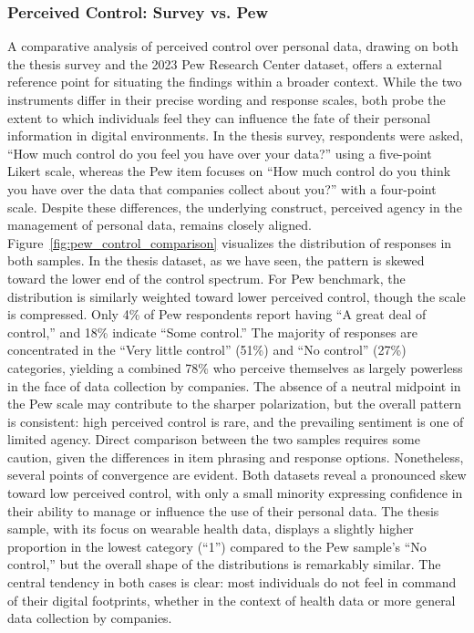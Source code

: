 	\subsubsection{Perceived Control: Survey vs. Pew}
		A comparative analysis of perceived control over personal data, drawing on both the thesis survey and the 2023 Pew Research Center dataset, offers a external reference point for situating the findings within a broader context. While the two instruments differ in their precise wording and response scales, both probe the extent to which individuals feel they can influence the fate of their personal information in digital environments. In the thesis survey, respondents were asked, “How much control do you feel you have over your data?” using a five-point Likert scale, whereas the Pew item focuses on “How much control do you think you have over the data that companies collect about you?” with a four-point scale. Despite these differences, the underlying construct, perceived agency in the management of personal data, remains closely aligned.
		Figure~\ref{fig:pew_control_comparison} visualizes the distribution of responses in both samples. In the thesis dataset, as we have seen, the pattern is skewed toward the lower end of the control spectrum.			
		For Pew benchmark, the distribution is similarly weighted toward lower perceived control, though the scale is compressed. Only 4\% of Pew respondents report having “A great deal of control,” and 18\% indicate “Some control.” The majority of responses are concentrated in the “Very little control” (51\%) and “No control” (27\%) categories, yielding a combined 78\% who perceive themselves as largely powerless in the face of data collection by companies. The absence of a neutral midpoint in the Pew scale may contribute to the sharper polarization, but the overall pattern is consistent: high perceived control is rare, and the prevailing sentiment is one of limited agency.
		Direct comparison between the two samples requires some caution, given the differences in item phrasing and response options. Nonetheless, several points of convergence are evident. Both datasets reveal a pronounced skew toward low perceived control, with only a small minority expressing confidence in their ability to manage or influence the use of their personal data. The thesis sample, with its focus on wearable health data, displays a slightly higher proportion in the lowest category (“1”) compared to the Pew sample’s “No control,” but the overall shape of the distributions is remarkably similar. The central tendency in both cases is clear: most individuals do not feel in command of their digital footprints, whether in the context of health data or more general data collection by companies.
